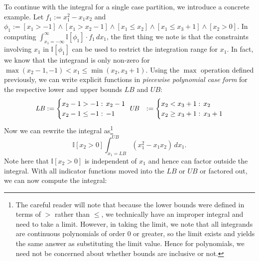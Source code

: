 \documentclass[letterpaper]{article}
\newcommand{\LB}{\mathit{LB}}
\newcommand{\UB}{\mathit{UB}}
\newcommand{\I}{\mathbb{I}}
\begin{document}
{To continue with the integral for a single case partition, we
introduce a concrete example.  Let $f_1 := x_1^2 - x_1 x_2$ and $\phi_1
:= [x_1 > -1] \land [x_1 > x_2-1] \land [x_1 \leq x_2] \land [x_1 \leq x_3 +1] \land [x_2 > 0]$.  
In computing $\int_{x_1=-\infty}^{\infty} \I[\phi_1] \cdot f_1 \, dx_1$,
the first thing we note is that the constraints involving $x_1$ in
$\I[\phi_1]$ can be used to restrict the integration range for $x_1$.
In fact, we know that the integrand is only non-zero for
$\max(x_2 - 1, -1) < x_1 \leq \min(x_2,x_3 + 1)$.  Using the $\max$
operation defined previously, we can 
write explicit functions in 
\emph{piecewise polynomial case form} for the respective 
lower and upper bounds $\LB$ and $\UB$:
{\footnotesize
\vspace{-1mm}
\begin{align*}
\LB &:=\begin{cases}
    x_2-1 > -1:&\hspace{-2mm} x_2 - 1 \\ 
    x_2-1 \leq -1:&\hspace{-2mm} -1 \\ 
  \end{cases}\;
\UB &:=\begin{cases}
    x_2<x_3+1:&\hspace{-2mm} x_2 \\ 
    x_2\geq x_3+1:&\hspace{-2mm} x_3 + 1 \\ 
  \end{cases}
\end{align*}
}
Now we can rewrite the integral as\footnote{The careful reader will note
that because the lower bounds were defined in terms of $>$
rather than $\leq$, we technically have an improper integral
and need to take a limit.  However, in taking the limit, we
note that all integrands are continuous polynomials
of order 0 or greater, so the limit exists and yields the
same answer as substituting the limit value.  Hence for 
polynomials, we need not be concerned about whether bounds
are inclusive or not.}
\vspace{-1mm}
\begin{equation}
\I[x_2 > 0] \int_{x_1=\LB}^{\UB} (x_1^2 - x_1 x_2) \, dx_1 .
\end{equation}
Note here that $\I[x_2 > 0]$ is independent of $x_1$ and hence
can factor outside the integral.  With all indicator functions
moved into the $\LB$ or $\UB$ or factored out, we can now compute
the integral:
\vspace{-1mm}
}
\end{document}
